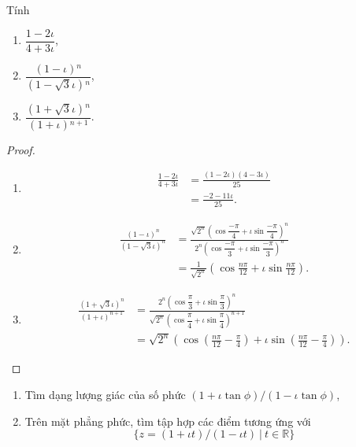 \begin{exercise}Tính
    \begin{enumerate}[label = (\alph*)]
        \item $\dfrac{1 - 2\iota}{4 + 3\iota}$,
        \item $\dfrac{(1 - \iota){}^{n}}{(1 - \sqrt{3}\iota){}^{n}}$,
        \item $\dfrac{(1 + \sqrt{3}\iota){}^{n}}{(1 + \iota){}^{n + 1}}$.
    \end{enumerate}
\end{exercise}

\begin{proof}
    \begin{enumerate}[label = (\alph*)]
        \item \begin{align*}
                  \frac{1 - 2\iota}{4 + 3\iota} & = \frac{(1 - 2\iota)(4 - 3\iota)}{25} \\
                                                & = \frac{-2 - 11\iota}{25}.
              \end{align*}
        \item \begin{align*}
                  \frac{{(1 - \iota)}^{n}}{{(1 - \sqrt{3}\iota)}^{n}} & = \frac{\sqrt{2^{n}}{\left(\cos\dfrac{-\pi}{4} +\iota\sin\dfrac{-\pi}{4}\right)}^{n}}{2^{n}{\left(\cos\dfrac{-\pi}{3} + \iota\sin\dfrac{-\pi}{3}\right)}^{n}} \\
                                                                      & =\frac{1}{\sqrt{2^{n}}}\left(\cos\frac{n\pi}{12}+\iota\sin\frac{n\pi}{12}\right).
              \end{align*}
        \item \begin{align*}
                  \frac{{(1 + \sqrt{3}\iota)}^{n}}{{(1+\iota)}^{n+1}} & = \frac{2^{n}{\left(\cos\dfrac{\pi}{3} + \iota\sin\dfrac{\pi}{3}\right)}^{n}}{\sqrt{2^{n}}{\left(\cos\dfrac{\pi}{4} + \iota\sin\dfrac{\pi}{4}\right)}^{n+1}} \\
                                                                      & = \sqrt{2^{n}}\left(\cos\left(\frac{n\pi}{12}-\frac{\pi}{4}\right) + \iota\sin\left(\frac{n\pi}{12} - \frac{\pi}{4}\right)\right).
              \end{align*}
    \end{enumerate}
\end{proof}

\begin{exercise}
    \begin{enumerate}[label = (\alph*)]
        \item Tìm dạng lượng giác của số phức $(1 + \iota\tan\phi)/(1 - \iota\tan\phi)$,
        \item Trên mặt phẳng phức, tìm tập hợp các điểm tương ứng với
              \[ \{ z = (1 + \iota t)/(1 - \iota t)\ |\ t\in\mathbb{R} \} \]
    \end{enumerate}
\end{exercise}

